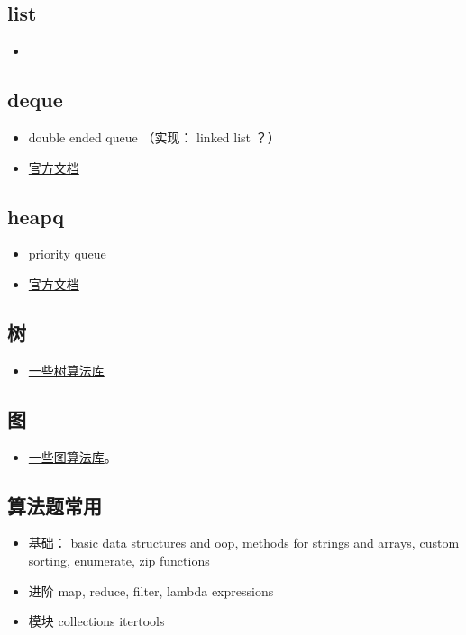 
\begin{issues}
\issueDraft
\end{issues}

\subsection{list}
\begin{itemize}
\item 
\end{itemize}


\subsection{deque}
\begin{itemize}
\item double ended queue （实现： linked list ？）
\item \href{https://docs.python.org/3/library/collections.html}{官方文档}
\end{itemize}

\subsection{heapq}
\begin{itemize}
\item priority queue
\item \href{https://docs.python.org/3/library/heapq.html}{官方文档}
\end{itemize}

\subsection{树}
\begin{itemize}
\item \href{https://stackoverflow.com/questions/2442014/tree-libraries-in-python}{一些树算法库}
\end{itemize}


\subsection{图}
\begin{itemize}
\item \href{https://wiki.python.org/moin/PythonGraphLibraries}{一些图算法库}。
\end{itemize}

\subsection{算法题常用}
\begin{itemize}
\item 基础： basic data structures and oop, methods for strings and arrays, custom sorting, enumerate, zip functions
\item 进阶 map, reduce, filter, lambda expressions
\item 模块 collections itertools
\end{itemize}
